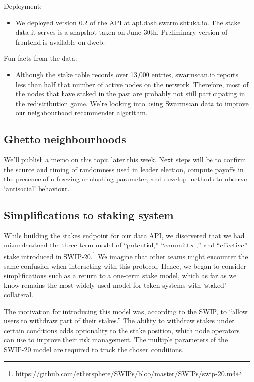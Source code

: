 Deployment:
%
\begin{itemize}
\item We deployed version 0.2 of the API at api.dash.swarm.shtuka.io. The stake data it serves is a snapshot taken on June 30th. Preliminary version of frontend is available on dweb.
\end{itemize}

Fun facts from the data:
%
\begin{itemize}
\item 
  Although the stake table records over 13,000 entries, \url{swarmscan.io} reports less than half that number of active nodes on the network.
  Therefore, most of the nodes that have staked in the past are probably not still participating in the redistribution game.
  We're looking into using Swarmscan data to improve our neighbourhood recommender algorithm.

\end{itemize}

\subsection*{Ghetto neighbourhoods}

We'll publish a memo on this topic later this week.
%
Next steps will be to confirm the source and timing of randomness used in leader election, compute payoffs in the presence of a freezing or slashing parameter, and develop methods to observe `antisocial' behaviour.

\subsection*{Simplifications to staking system}

While building the stakes endpoint for our data API, we discovered that we had misunderstood the three-term model of ``potential,'' ``committed,'' and ``effective'' stake introduced in SWIP-20.\footnote{\url{https://github.com/ethersphere/SWIPs/blob/master/SWIPs/swip-20.md}}
%
We imagine that other teams might encounter the same confusion when interacting with this protocol.
%
Hence, we began to consider simplifications such as a return to a one-term stake model, which as far as we know remains the most widely used model for token systems with `staked' collateral.

The motivation for introducing this model was, according to the SWIP, to ``allow users to withdraw part of their stakes.''
%
The ability to withdraw stakes under certain conditions adds optionality to the stake position, which node operators can use to improve their risk management.
%
The multiple parameters of the SWIP-20 model are required to track the chosen conditions.

